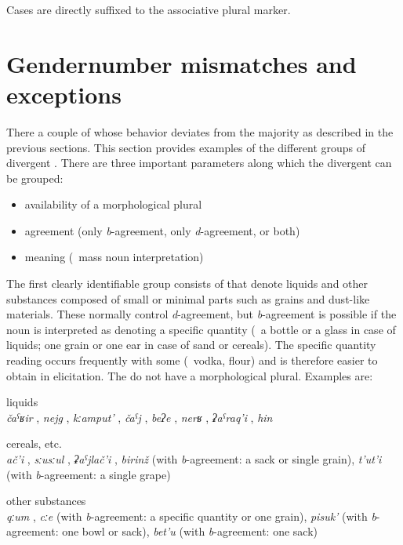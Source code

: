 Cases are directly suffixed to the associative plural marker.



\section{Gender\tnd number mismatches and exceptions}
\label{sec:Gendernumbermismatchesandexceptions}

There a couple of  whose behavior deviates from the majority as described in the previous sections. This section provides examples of the different groups of divergent . There are three important parameters along which the divergent  can be grouped:
%
\begin{itemize}
	\item availability of a morphological plural
	\item {} agreement (only \textit{b}-agreement, only \textit{d}-agreement, or both)
	\item meaning (\teg\ mass noun interpretation)
\end{itemize}
%
The first clearly identifiable group consists of  that denote liquids and other substances composed of small or minimal parts such as grains and dust-like materials. These  normally control \textit{d}-agreement, but \textit{b}-agreement is possible if the noun is interpreted as denoting a specific quantity (\teg\ a bottle or a glass in case of liquids; one grain or one ear in case of sand or cereals). The specific quantity reading occurs frequently with some  (\teg\ vodka, flour) and is therefore easier to obtain in elicitation. The  do not have a morphological plural. Examples are:
%
\begin{exe}
	\ex	liquids\\
		\textit{čaˁʁir} , \textit{nejg} , \textit{kːamput'} , \textit{čaˁj} , \textit{beʔe} , \textit{nerʁ} , \textit{ʡaˁraq'i} , \textit{hin} 

	\ex	cereals, etc. \\
		\textit{ač'i} , \textit{sːusːul} , \textit{ʡaˁjlač'i} , \textit{birinž}  (with \textit{b}-agreement: a sack or single grain), \textit{t'ut'i}  (with \textit{b}-agreement: a single grape)
	
	\ex	other substances\\
		\textit{qːum} , \textit{cːe}  (with \textit{b}-agreement: a specific quantity or one grain), \textit{pisuk'}  (with \textit{b}-agreement: one bowl or sack), \textit{bet'u}  (with \textit{b}-agreement: one sack)
\end{exe}

